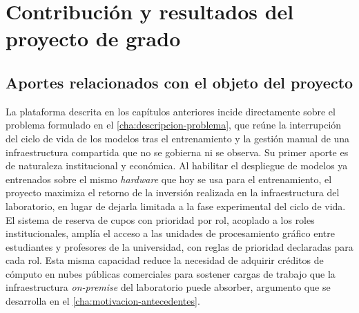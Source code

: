 %
\chapter{Contribución y resultados del proyecto de grado}\label{cha:contribucion-resultados}

\section{Aportes relacionados con el objeto del proyecto}

La plataforma descrita en los capítulos anteriores incide directamente sobre el problema formulado en el \cref{cha:descripcion-problema}, que reúne la interrupción del ciclo de vida de los modelos tras el entrenamiento y la gestión manual de una infraestructura compartida que no se gobierna ni se observa. Su primer aporte es de naturaleza institucional y económica. Al habilitar el despliegue de modelos ya entrenados sobre el mismo \emph{hardware} que hoy se usa para el entrenamiento, el proyecto maximiza el retorno de la inversión realizada en la infraestructura del laboratorio, en lugar de dejarla limitada a la fase experimental del ciclo de vida. El sistema de reserva de cupos con prioridad por rol, acoplado a los roles institucionales, amplía el acceso a las unidades de procesamiento gráfico entre estudiantes y profesores de la universidad, con reglas de prioridad declaradas para cada rol. Esta misma capacidad reduce la necesidad de adquirir créditos de cómputo en nubes públicas comerciales para sostener cargas de trabajo que la infraestructura \emph{on-premise} del laboratorio puede absorber, argumento que se desarrolla en el \cref{cha:motivacion-antecedentes}.

